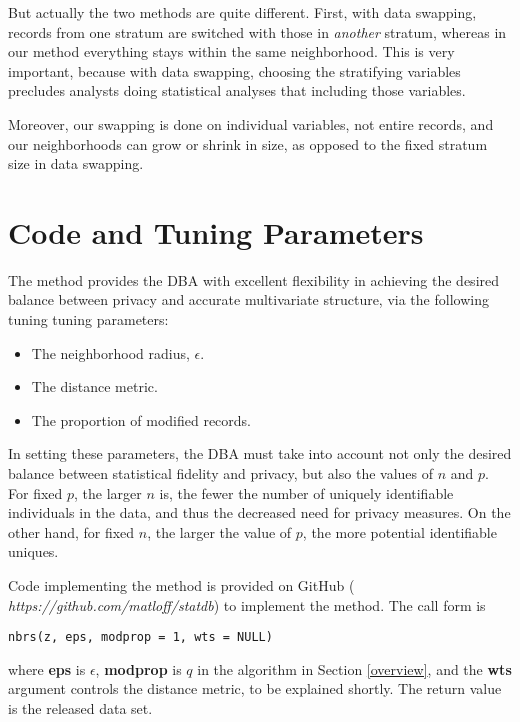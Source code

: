 \documentclass[11pt]{article}
\begin{document}
But actually the two methods are quite different.  First, with data
swapping, records from one stratum are switched with those in {\it
another} stratum, whereas in our method everything stays within the same
neighborhood.  This is very important, because with data swapping,
choosing the stratifying variables precludes analysts doing statistical
analyses that including those variables.

Moreover, our swapping is done on individual variables, not entire
records, and our neighborhoods can grow or shrink in size, as opposed to
the fixed stratum size in data swapping.  

\section{Code and Tuning Parameters}

The method provides the DBA with excellent flexibility in achieving the
desired balance between privacy and accurate multivariate structure, via
the following tuning tuning parameters:

\begin{itemize}

\item The neighborhood radius, $\epsilon$.

\item The distance metric.

\item The proportion of modified records.  

\end{itemize}

In setting these parameters, the DBA must take into account not only the
desired balance between statistical fidelity and privacy, but also the
values of $n$ and $p$.  For fixed $p$, the larger $n$ is, the fewer the
number of uniquely identifiable individuals in the data, and thus the
decreased need for privacy measures.  On the other hand, for fixed $n$,
the larger the value of $p$, the more potential identifiable uniques.

Code implementing the method is provided on GitHub ({\it
https://github.com/matloff/statdb}) to implement the method.  The call
form is

\begin{lstlisting}
nbrs(z, eps, modprop = 1, wts = NULL) 
\end{lstlisting}

where {\bf eps} is $\epsilon$, {\bf modprop} is $q$ in the algorithm
in Section \ref{overview}, and the {\bf wts} argument controls the
distance metric, to be explained shortly.  The return value is the
released data set.
\end{document}
